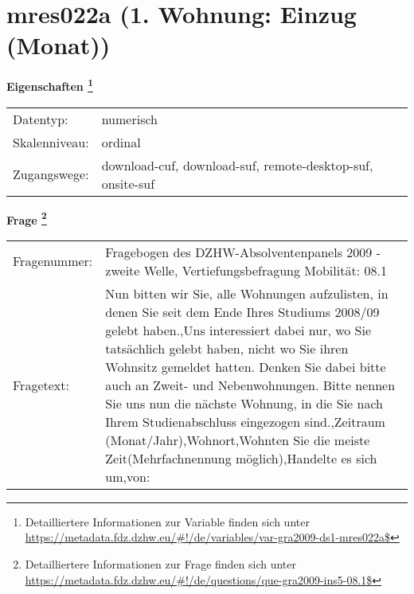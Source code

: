 
    \setcounter{footnote}{0}

    \vspace*{-1.8cm}
	\section{mres022a (1. Wohnung: Einzug (Monat))}
	\label{section:mres022a}



    \vspace*{0.5cm}
    \noindent\textbf{Eigenschaften
	\footnote{Detailliertere Informationen zur Variable finden sich unter
		\url{https://metadata.fdz.dzhw.eu/\#!/de/variables/var-gra2009-ds1-mres022a$}}}\\
	\begin{tabularx}{\hsize}{@{}lX}
	Datentyp: & numerisch \\
	Skalenniveau: & ordinal \\
	Zugangswege: &
	  download-cuf, 
	  download-suf, 
	  remote-desktop-suf, 
	  onsite-suf
 \\
    \end{tabularx}



				\vspace*{0.5cm}
                \noindent\textbf{Frage
	                \footnote{Detailliertere Informationen zur Frage finden sich unter
		              \url{https://metadata.fdz.dzhw.eu/\#!/de/questions/que-gra2009-ins5-08.1$}}}\\
				\begin{tabularx}{\hsize}{@{}lX}
					Fragenummer: &
					  Fragebogen des DZHW-Absolventenpanels 2009 - zweite Welle, Vertiefungsbefragung Mobilität:
					  08.1
 \\
					Fragetext: & Nun bitten wir Sie, alle Wohnungen aufzulisten, in denen Sie seit dem Ende Ihres Studiums 2008/09 gelebt haben.,Uns interessiert dabei nur, wo Sie tatsächlich gelebt haben, nicht wo Sie ihren Wohnsitz gemeldet hatten. Denken Sie dabei bitte auch an Zweit- und Nebenwohnungen. Bitte nennen Sie uns nun die nächste Wohnung, in die Sie nach Ihrem Studienabschluss eingezogen sind.,Zeitraum (Monat/Jahr),Wohnort,Wohnten Sie die meiste Zeit(Mehrfachnennung möglich),Handelte es sich um,von: \\
				\end{tabularx}





